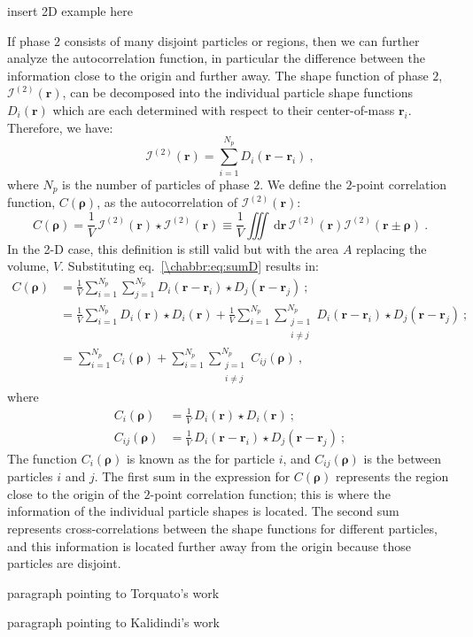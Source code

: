 {\color{blue}insert 2D example here}

If phase $2$ consists of many disjoint particles or regions, then we can further analyze the autocorrelation function, in particular the difference between the information close to the origin and further away.  The shape function of phase $2$, $\mathcal{I}^{(2)}(\mathbf{r})$, can be decomposed into the individual particle shape functions $D_i(\mathbf{r})$ which are each determined with respect to their center-of-mass $\mathbf{r}_i$. Therefore, we have:
\begin{equation}
	\mathcal{I}^{(2)}(\mathbf{r}) = \sum_{i=1}^{N_p}D_i(\mathbf{r}-\mathbf{r}_i)\ ,\label{\chabbr:eq:sumD}
\end{equation}
where $N_p$ is the number of particles of phase $2$.  We define the $2$-point correlation function, $C(\bm{\rho})$, as the autocorrelation of $\mathcal{I}^{(2)}(\mathbf{r})$:
\begin{equation}
	C(\bm{\rho})=\frac{1}{V}\,\mathcal{I}^{(2)}(\mathbf{r})\star\mathcal{I}^{(2)}(\mathbf{r})\equiv\frac{1}{V}\iiint\,\mathrm{d}\mathbf{r}\,\mathcal{I}^{(2)}(\mathbf{r})\mathcal{I}^{(2)}(\mathbf{r}\pm\bm{\rho})\ .
\end{equation}
In the 2-D case, this definition is still valid but with the area $A$ replacing the volume, $V$. Substituting eq.~\ref{\chabbr:eq:sumD} results in:
\begin{equation}
\begin{split}
	C(\bm{\rho})&=\frac{1}{V}\sum_{i=1}^{N_p}\sum_{j=1}^{N_p}D_i(\mathbf{r}-\mathbf{r}_i)\star D_j(\mathbf{r}-\mathbf{r}_j)\ ;\\
	&=\frac{1}{V}\sum_{i=1}^{N_p}D_i(\mathbf{r})\star D_i(\mathbf{r}) + \frac{1}{V}\sum_{i=1}^{N_p}\sum_{\substack{j=1\\ i\ne j}}^{N_p}D_i(\mathbf{r}-\mathbf{r}_i)\star D_j(\mathbf{r}-\mathbf{r}_j)\ ;\\
	&=\sum_{i=1}^{N_p}C_i(\bm{\rho}) + \sum_{i=1}^{N_p}\sum_{\substack{j=1\\ i\ne j}}^{N_p}C_{ij}(\bm{\rho})\ ,
\end{split}
\end{equation}
 where
 \begin{equation*}
 \begin{split}
 	C_i(\bm{\rho}) &= \frac{1}{V}\,D_i(\mathbf{r})\star D_i(\mathbf{r})\ ;\\
	C_{ij}(\bm{\rho}) &= \frac{1}{V}\,D_i(\mathbf{r}-\mathbf{r}_i)\star D_j(\mathbf{r}-\mathbf{r}_j)\ ;
 \end{split}
 \end{equation*}
The function $C_i(\bm{\rho})$ is known as the  for particle $i$, and $C_{ij}(\bm{\rho})$ is the  between particles $i$ and $j$.  The first sum in the expression for $C(\bm{\rho})$ represents the region close to the origin of the $2$-point correlation function; this is where the information of the individual particle shapes is located. The second sum represents cross-correlations between the shape functions for different particles, and this information is located further away from the origin because those particles are disjoint.

{\color{blue}paragraph pointing to Torquato's work}

{\color{blue}paragraph pointing to Kalidindi's work}








